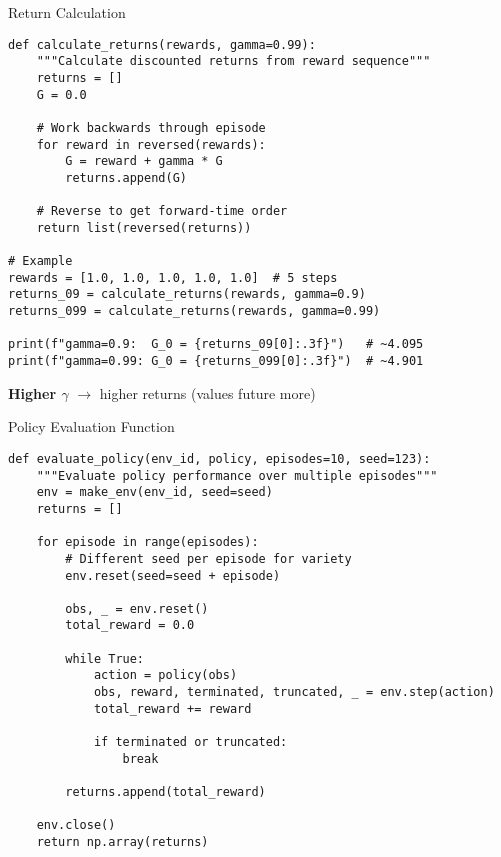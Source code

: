 \documentclass[aspectratio=169,10pt]{beamer}
\begin{document}
\begin{frame}[fragile]{Return Calculation}

\begin{lstlisting}
def calculate_returns(rewards, gamma=0.99):
    """Calculate discounted returns from reward sequence"""
    returns = []
    G = 0.0
    
    # Work backwards through episode
    for reward in reversed(rewards):
        G = reward + gamma * G
        returns.append(G)
    
    # Reverse to get forward-time order
    return list(reversed(returns))

# Example
rewards = [1.0, 1.0, 1.0, 1.0, 1.0]  # 5 steps
returns_09 = calculate_returns(rewards, gamma=0.9)
returns_099 = calculate_returns(rewards, gamma=0.99)

print(f"gamma=0.9:  G_0 = {returns_09[0]:.3f}")   # ~4.095
print(f"gamma=0.99: G_0 = {returns_099[0]:.3f}")  # ~4.901
\end{lstlisting}

\textbf{Higher $\gamma$} $\rightarrow$ higher returns (values future more)

\end{frame}

\begin{frame}[fragile]{Policy Evaluation Function}

\begin{lstlisting}
def evaluate_policy(env_id, policy, episodes=10, seed=123):
    """Evaluate policy performance over multiple episodes"""
    env = make_env(env_id, seed=seed)
    returns = []
    
    for episode in range(episodes):
        # Different seed per episode for variety
        env.reset(seed=seed + episode)
        
        obs, _ = env.reset()
        total_reward = 0.0
        
        while True:
            action = policy(obs)
            obs, reward, terminated, truncated, _ = env.step(action)
            total_reward += reward
            
            if terminated or truncated:
                break
        
        returns.append(total_reward)
    
    env.close()
    return np.array(returns)
\end{lstlisting}

\end{frame}
\end{document}
